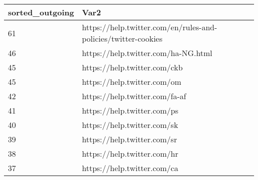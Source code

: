\begin{tabular}{ll}
sorted_outgoing & Var2 \\ 
\hline 
61 & https://help.twitter.com/en/rules-and-policies/twitter-cookies \\ 
46 & https://help.twitter.com/ha-NG.html \\ 
45 & https://help.twitter.com/ckb \\ 
45 & https://help.twitter.com/om \\ 
42 & https://help.twitter.com/fa-af \\ 
41 & https://help.twitter.com/ps \\ 
40 & https://help.twitter.com/sk \\ 
39 & https://help.twitter.com/sr \\ 
38 & https://help.twitter.com/hr \\ 
37 & https://help.twitter.com/ca \\ 
\hline 
\end{tabular}